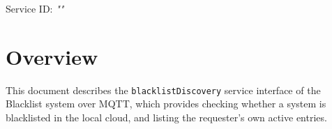 \documentclass[a4paper]{arrowhead}
\begin{document}
\sloppy

\ArrowheadSetup

\begin{center}
  \vspace*{1cm}
  \huge{\arrowtitle}

  \vspace*{0.2cm}
  \LARGE{\arrowtype}
  \vspace*{1cm}

  \Large{Service ID: \textit{"\arrowid"}}

  \vspace*{\fill}


  \vspace*{1cm}
  \vspace*{\fill}

  \begin{abstract}
    This document describes the MQTT protocol with TLS payload security and JSON payload encoding variant of the \texttt{blacklistDiscovery} service of the Blacklist system.
  \end{abstract}

  \vspace*{1cm}
\end{center}

\newpage

\tableofcontents
\newpage

\section{Overview}
\label{sec:overview}

This document describes the \texttt{blacklistDiscovery} service interface of the Blacklist system over MQTT, which provides checking whether a system is blacklisted in the local cloud, and listing the requester's own active entries.
\end{document}

